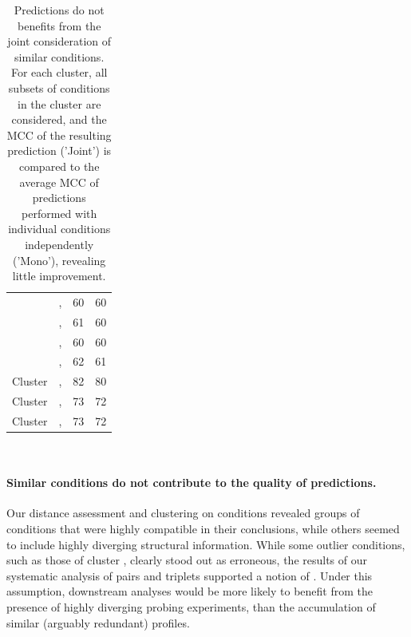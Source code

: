 \documentclass[a4,center,fleqn]{NAR}
\begin{document}
\begin{table}[ht]
{\begin{adjustbox}{max width=\linewidth}
\begin{tabular}{@{}llHH@{}}
				& \NAICE, \NMIACE                                & 60                  & 60                      \\
				& \BzCN, \OneMSevCE                                & 61                  & 60                      \\
				& \BzCN, \NMIACE                                & 60                  & 60                      \\
				& \OneMSevCE, \NMIACE                              & 62                  & 61                      \\ \midrule
				{Cluster }                         & \OneMSevILUMg, \OneMSevILUThreeMg                        & 82                  & 80                      \\ \midrule
				{Cluster } & \OneMSevMgCE, \NMIAMgCE                          & 73                  & 72                      \\ \midrule
				{Cluster }                         & \NAIMg, \CMCTMg                              & 73                  & 72                      \\ \bottomrule
			\end{tabular}
		\end{adjustbox}
		\\}
	\caption{Predictions do not benefits from the joint consideration of similar conditions. For each cluster, all subsets of conditions in the cluster are considered, and the MCC of the resulting prediction ('Joint') is compared to the average MCC of predictions performed with individual conditions independently ('Mono'), revealing little improvement.}\label{fig:similarconds}
\end{table}

\paragraph{Similar conditions do not contribute to the quality of predictions.} 
Our distance assessment and clustering on conditions revealed groups of conditions that were highly compatible in their conclusions, while others seemed to include highly diverging structural information. While some outlier conditions, such as those of cluster , clearly stood out as erroneous, the results of our systematic analysis of pairs and triplets supported a notion of . Under this assumption, downstream analyses would be more likely to benefit from the presence of highly diverging probing experiments, than the accumulation of similar (arguably redundant) profiles. 
\end{document}
